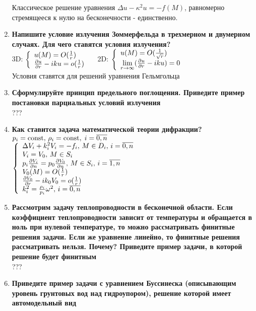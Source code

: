 \begin{enumerate}
      Классическое решение уравнения $\Delta u -\kappa^2 u = -f(M)$, равномерно стремящееся к нулю на бесконечности - единственно.
\item \textbf{Напишите условие излучения Зоммерфельда в трехмерном и двумерном случаях. Для чего ставятся условия излучения?}\\
      3D:
      $\left\{\begin{array}{l}
            u(M)=O(\frac{1}{r})\\
            \frac{\partial u}{\partial r}-iku=o(\frac{1}{r})
      \end{array}\right.\;\;\;$
      2D:
      $\left\{\begin{array}{l}
            u(M)=O(\frac{1}{\sqrt{r}})\\
            \lim\limits_{r\to\infty}(\frac{\partial u}{\partial r}-iku)=0
      \end{array}\right.$\\
      Условия ставятся для решений уравнения Гельмгольца
\item \textbf{Сформулируйте принцип предельного поглощения. Приведите пример постановки парциальных условий излучения}\\
      ???
\item \textbf{Как ставится задача математической теории дифракции?}\\
      $p_i=\operatorname{const},\,\rho_i=\operatorname{const},\;i=\overline{0,n}$\\
      $\left\{\begin{array}{l}
            \Delta V_i+k_i^2 V_i=-f_i,\,M\in D_i,\,i=\overline{0,n}\\
            V_i = V_0,\,M\in S_i\\
            p_i \frac{\partial V_i}{\partial n}=p_0\frac{\partial V_0}{\partial n},\,M\in S_i,\,i=\overline{1,n}\\
            V_0(M) = O(\frac{1}{r})\\
            \frac{\partial V_0}{\partial r}-ik_0 V_0 = o(\frac{1}{r})\\
            k_i^2=\frac{\rho_i}{p_i}\omega^2,\,i=\overline{0,n}
      \end{array}\right.$
\item \textbf{Рассмотрим задачу теплопроводности в бесконечной области. Если коэффициент теплопроводности зависит от температуры и обращается в ноль при нулевой температуре, то можно рассматривать финитные решения задачи. Если же уравнение линейно, то финитные решения рассматривать нельзя. Почему? Приведите пример задачи, в которой решение будет финитным}\\
      ???
\item \textbf{Приведите пример задачи с уравнением Буссинеска (описывающим уровень грунтовых вод над гидроупором), решение которой имеет автомодельный вид}\\

\end{enumerate}

